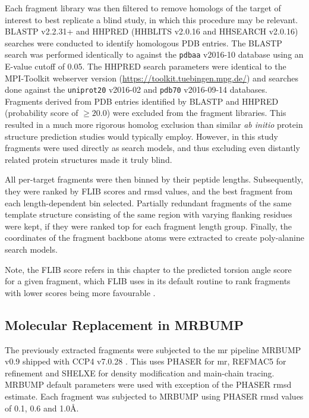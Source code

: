 Each fragment library was then filtered to remove homologs of the target of interest to best replicate a blind study, in which this procedure may be relevant. BLASTP v2.2.31+ \cite{Altschul1990-og,Camacho2009-th} and HHPRED (HHBLITS v2.0.16 and HHSEARCH v2.0.16) \cite{Soding2005-sx} searches were conducted to identify homologous PDB entries. The BLASTP search was performed identically to \textcite{De_Oliveira2015-kb} against the \texttt{pdbaa} v2016-10 database using an E-value cutoff of 0.05. The HHPRED search parameters were identical to the MPI-Toolkit \cite{Biegert2006-cb} webserver version (\url{https://toolkit.tuebingen.mpg.de/}) and searches done against the \texttt{uniprot20} v2016-02 and \texttt{pdb70} v2016-09-14 databases. Fragments derived from PDB entries identified by BLASTP and HHPRED (probability score of $\geq20.0$) were excluded from the fragment libraries. This resulted in a much more rigorous homolog exclusion than similar \textit{ab initio} protein structure prediction studies would typically employ. However, in this study fragments were used directly as search models, and thus excluding even distantly related protein structures made it truly blind.

All per-target fragments were then binned by their peptide lengths. Subsequently, they were ranked by FLIB scores and \gls{rmsd} values, and the best fragment from each length-dependent bin selected. Partially redundant fragments of the same template structure consisting of the same region with varying flanking residues were kept, if they were ranked top for each fragment length group. Finally, the coordinates of the fragment backbone atoms were extracted to create poly-alanine search models.

Note, the FLIB score refers in this chapter to the predicted torsion angle score for a given fragment, which FLIB uses in its default routine to rank fragments with lower scores being more favourable \cite{De_Oliveira2015-kb}. 

\subsection{Molecular Replacement in MRBUMP}
The previously extracted fragments were subjected to the \gls{mr} pipeline MRBUMP v0.9 shipped with CCP4 v7.0.28 \cite{Keegan2018-kn}. This uses PHASER \cite{McCoy2007-mp} for \gls{mr}, REFMAC5 \cite{Murshudov2011-ww} for refinement and SHELXE \cite{Thorn2013-le} for density modification and main-chain tracing. MRBUMP default parameters were used with exception of the PHASER \gls{rmsd} estimate. Each fragment was subjected to MRBUMP using PHASER \gls{rmsd} values of 0.1, 0.6 and 1.0\AA.


